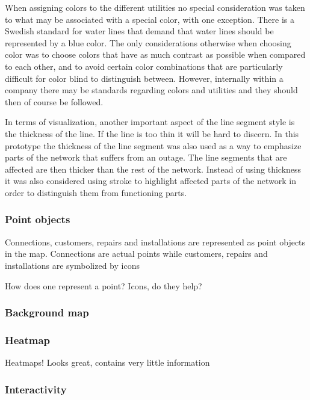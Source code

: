 \documentclass[a4paper,12pt,titlepage]{article}
\begin{document}
When assigning colors to the different utilities no special consideration was taken to what may be associated with a special color, with one exception. There is a Swedish standard for water lines that demand that water lines should be represented by a blue color. The only considerations otherwise when choosing color was to choose colors that have as much contrast as possible when compared to each other, and to avoid certain color combinations that are particularly difficult for color blind to distinguish between. However, internally within a company there may be standards regarding colors and utilities and they should then of course be followed.

In terms of visualization, another important aspect of the line segment style is the thickness of the line. If the line is too thin it will be hard to discern. In this prototype the thickness of the line segment was also used as a way to emphasize parts of the network that suffers from an outage. The line segments that are affected are then thicker than the rest of the network. Instead of using thickness it was also considered using stroke to highlight affected parts of the network in order to distinguish them from functioning parts.

\subsubsection{Point objects}

Connections, customers, repairs and installations are represented as point objects in the map. Connections are actual points while customers, repairs and installations are symbolized by icons

How does one represent a point? Icons, do they help?

\subsubsection{Background map}

\subsubsection{Heatmap}
Heatmaps! Looks great, contains very little information


\subsubsection{Interactivity}
\end{document}
